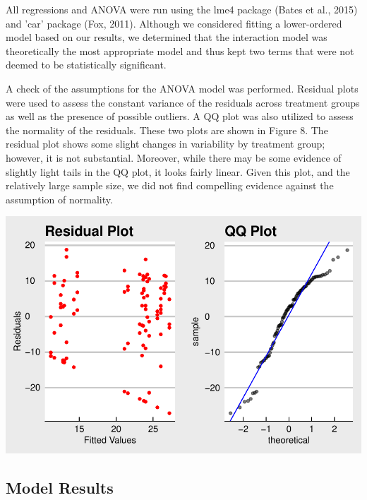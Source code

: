 \documentclass[1p,12pt]{elsarticle}\usepackage[]{graphicx}\usepackage[]{color}
\makeatletter
\def\maxwidth{ %
  \ifdim\Gin@nat@width>\linewidth
    \linewidth
  \else
    \Gin@nat@width
  \fi
}
\newenvironment{knitrout}{}{} %
\makeatother
\begin{document}
All regressions and ANOVA were run using the lme4 package (Bates et al., 2015) and 'car' package (Fox, 2011).  Although we considered fitting a lower-ordered model based on our results, we determined that the interaction model was theoretically the most appropriate model and thus kept two terms that were not deemed to be statistically significant. 

A check of the assumptions for the ANOVA model was performed. Residual plots were used to assess the constant variance of the residuals across treatment groups as well as the presence of possible outliers. A QQ plot was also utilized to assess the normality of the residuals. These two plots are shown in Figure 8. The residual plot shows some slight changes in variability by treatment group; however, it is not substantial. Moreover, while there may be some evidence of slightly light tails in the QQ plot, it looks fairly linear. Given this plot, and the relatively large sample size, we did not find compelling evidence against the assumption of normality. 

\begin{knitrout}
\color{fgcolor}

{\centering \includegraphics[width=\maxwidth]{figure/assess-1} 

}



\end{knitrout}


\subsection{Model Results}
\end{document}

